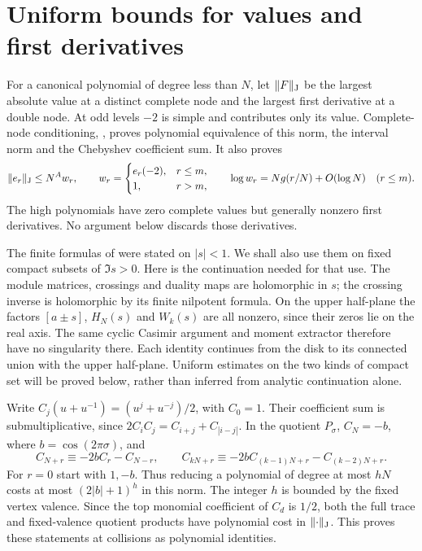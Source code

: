 \section{Uniform bounds for values and first derivatives}\label{ms:finite}
For a canonical polynomial of degree less than $N$, let $\lVert F\rVert_{\mathrm J}$
be the largest absolute value at a distinct complete node and the
largest first derivative at a double node. At odd levels $-2$ is
simple and contributes only its value. Complete-node conditioning,
\cite[Lemma 2.1]{Bounds}, proves polynomial equivalence of this norm,
the interval norm and the Chebyshev coefficient sum. It also proves
\begin{equation}\label{ms:basis-norm}
 \lVert e_r\rVert_{\mathrm J}\le N^A w_r,\qquad
 w_r=\begin{cases}e_r(-2),&r\le m,\\1,&r>m,\end{cases}
 \qquad \log w_r=Ng(r/N)+O(\log N)\quad(r\le m).
\end{equation}
The high polynomials have zero complete values but generally nonzero
first derivatives. No argument below discards those derivatives.

The finite formulas of \cite{Meridian} were stated on $|s|<1$.
We shall also use them on fixed compact subsets of $\Im s>0$.
Here is the continuation needed for that use. The module matrices,
crossings and duality maps are holomorphic in $s$; the crossing
inverse is holomorphic by its finite nilpotent formula. On the upper
half-plane the factors $[a\pm s]$, $H_N(s)$ and $W_k(s)$ are all
nonzero, since their zeros lie on the real axis. The same cyclic
Casimir argument and moment extractor therefore have no singularity
there. Each identity continues from the disk to its connected union
with the upper half-plane. Uniform estimates on the two kinds of
compact set will be proved below, rather than inferred from analytic
continuation alone.

Write $C_j(u+u^{-1})=(u^j+u^{-j})/2$, with $C_0=1$. Their
coefficient sum is submultiplicative, since
$2C_iC_j=C_{i+j}+C_{|i-j|}$. In the quotient $P_\sigma$,
$C_N=-b$, where $b=\cos(2\pi\sigma)$, and
\[
 C_{N+r}\equiv-2bC_r-C_{N-r},\qquad
 C_{kN+r}\equiv-2bC_{(k-1)N+r}-C_{(k-2)N+r}.
\]
For $r=0$ start with $1,-b$. Thus reducing a polynomial of degree
at most $hN$ costs at most $(2|b|+1)^h$ in this norm. The integer
$h$ is bounded by the fixed vertex valence. Since the top monomial
coefficient of $C_d$ is $1/2$, both the full trace and fixed-valence
quotient products have polynomial cost in $\lVert \cdot\rVert_{\mathrm J}$. This
proves these statements at collisions as polynomial identities.

